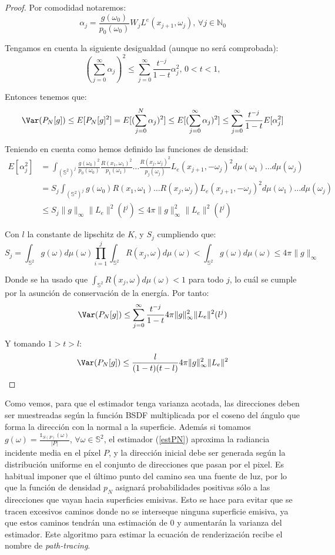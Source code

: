 \begin{proof}
  Por comodidad notaremos:
  $$\alpha_j = \frac{g(\omega_0)}{p_0(\omega_0)}W_jL^e(x_{j+1},\omega_j)\text{, }\forall j\in \mathds{N}_0$$

  Tengamos en cuenta la siguiente desigualdad (aunque no será comprobada):
$$(\sum_{j=0}^{\infty}\alpha_j)^2\leq \sum_{j=0}^{\infty}\frac{t^{-j}}{1-t}\alpha_j^2 \text{, } 0<t<1,$$

  Entonces tenemos que:
$$ \Var(P_N[g])\leq E[P_N[g]^2]=E[(\sum_{j=0}^{N}\alpha_j)^2]\leq E[(\sum_{j=0}^{\infty}\alpha_j)^2]\leq\sum_{j=0}^{\infty}\frac{t^{-j}}{1-t}E[\alpha_j^2]$$

  Teniendo en cuenta como hemos definido las funciones de densidad:
  \begin{align*}
    E[\alpha_j^2] &= \int_{(\mathds{S}^2)^j} \frac{g(\omega_0)^2}{p_0(\omega_0)}\frac{R(x_1,\omega_1)^2}{p_1(\omega_1)}\ldots\frac{R(x_j,\omega_j)^2}{p_j(\omega_j)}L_e(x_{j+1},-\omega_j)^2d\mu(\omega_1)\ldots d\mu(\omega_j)\\
    &=S_j \int_{(\mathds{S}^2)^j} g(\omega_0)R(x_1,\omega_1)\ldots R(x_j,\omega_j)L_e(x_{j+1},-\omega_j)^2d\mu(\omega_1)\ldots d\mu(\omega_j)\\
    &\leq S_j \|g\|_{\infty} \|L_e\|^2 (l^j)\leq 4\pi \|g\|_{\infty}^2\|L_e\|^2 (l^j)
  \end{align*}

  Con $l$ la constante de lipschitz de $K$, y $S_j$ cumpliendo que: 
  $$S_j=\int_{\mathds{S}^2}g(\omega)d\mu(\omega) \prod_{i=1}^j\int_{\mathds{S}^2}R(x_j, \omega)d\mu(\omega)< \int_{\mathds{S}^2}g(\omega)d\mu(\omega) \leq 4\pi \|g\|_{\infty}$$

  Donde se ha usado que $\int_{\mathds{S}^2}R(x_j, \omega)d\mu(\omega)<1$ para todo $j$, lo cuál se cumple por la asunción de conservación de la energía. Por tanto:
  $$\Var(P_N[g])\leq \sum_{j=0}^{\infty}\frac{t^{-j}}{1-t} 4\pi \|g\|_{\infty}^2 \|L_e\|^2 (l^j)$$

  Y tomando $1>t>l$:
  $$\Var(P_N[g])\leq \frac{l}{(1-t)(t-l)} 4\pi \|g\|_{\infty}^2 \|L_e\|^2$$
  \end{proof}


Como vemos, para que el estimador tenga varianza acotada, las direcciones deben ser muestreadas según la función BSDF multiplicada por el coseno del ángulo que forma la dirección con la normal a la superficie. Además si tomamos $g(\omega) = \frac{\mathds{1}_{S(P)}(\omega)}{|P|}$, $\forall \omega\in\mathds{S}^2$, el estimador (\ref{estPN}) aproxima la radiancia incidente media en el píxel $P$, y la dirección inicial debe ser generada según la distribución uniforme en el conjunto de direcciones que pasan por el pixel. Es habitual imponer que el último punto del camino sea una fuente de luz, por lo que la función de densidad $p_N$ asignará probabilidades positivas sólo a las direcciones que vayan hacia superficies emisivas. Esto se hace para evitar que se tracen excesivos caminos donde no se interseque ninguna superficie emisiva, ya que estos caminos tendrán una estimación de $0$ y aumentarán la varianza del estimador. Este algoritmo para estimar la ecuación de renderización recibe el nombre de \emph{path-tracing}.
